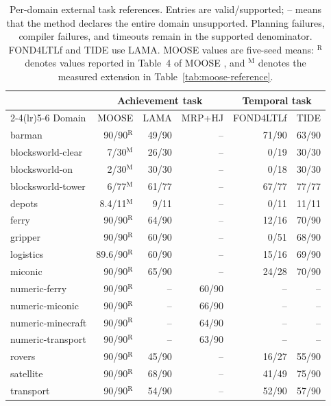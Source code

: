 \begin{table}[htbp]
\centering
\small
\setlength{\tabcolsep}{3.2pt}
\begin{tabular}{lrrrrr}
\toprule
& \multicolumn{3}{c}{Achievement task} & \multicolumn{2}{c}{Temporal task} \\
\cmidrule(lr){2-4}\cmidrule(lr){5-6}
Domain & MOOSE & LAMA & MRP+HJ & FOND4LTLf & TIDE \\
\midrule
barman & 90/90$^{\mathrm{R}}$ & 49/90 & -- & 71/90 & 63/90 \\
blocksworld-clear & 7/30$^{\mathrm{M}}$ & 26/30 & -- & 0/19 & 30/30 \\
blocksworld-on & 2/30$^{\mathrm{M}}$ & 30/30 & -- & 0/18 & 30/30 \\
blocksworld-tower & 6/77$^{\mathrm{M}}$ & 61/77 & -- & 67/77 & 77/77 \\
depots & 8.4/11$^{\mathrm{M}}$ & 9/11 & -- & 0/11 & 11/11 \\
ferry & 90/90$^{\mathrm{R}}$ & 64/90 & -- & 12/16 & 70/90 \\
gripper & 90/90$^{\mathrm{R}}$ & 60/90 & -- & 0/51 & 68/90 \\
logistics & 89.6/90$^{\mathrm{R}}$ & 60/90 & -- & 15/16 & 69/90 \\
miconic & 90/90$^{\mathrm{R}}$ & 65/90 & -- & 24/28 & 70/90 \\
numeric-ferry & 90/90$^{\mathrm{R}}$ & -- & 60/90 & -- & -- \\
numeric-miconic & 90/90$^{\mathrm{R}}$ & -- & 66/90 & -- & -- \\
numeric-minecraft & 90/90$^{\mathrm{R}}$ & -- & 64/90 & -- & -- \\
numeric-transport & 90/90$^{\mathrm{R}}$ & -- & 63/90 & -- & -- \\
rovers & 90/90$^{\mathrm{R}}$ & 45/90 & -- & 16/27 & 55/90 \\
satellite & 90/90$^{\mathrm{R}}$ & 68/90 & -- & 41/49 & 75/90 \\
transport & 90/90$^{\mathrm{R}}$ & 54/90 & -- & 52/90 & 57/90 \\
\bottomrule
\end{tabular}
\caption{Per-domain external task references. Entries are valid/supported; --
means that the method declares the entire domain unsupported. Planning failures,
compiler failures, and timeouts remain in the supported denominator. FOND4LTLf
and TIDE use LAMA. MOOSE values are five-seed means: $^{\mathrm{R}}$ denotes
values reported in Table~4 of MOOSE \cite{Chen2025MooseExtended}, and
$^{\mathrm{M}}$ denotes the measured extension in
Table~\ref{tab:moose-reference}.}
\label{tab:external-references}
\end{table}

